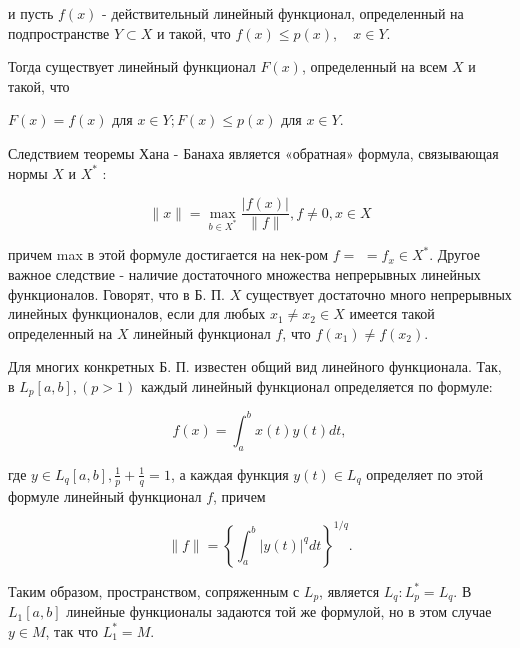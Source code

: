 \documentclass[10pt]{article}
\begin{document}
и пусть $f(x)$ - действительный линейный функционал, определенный на подпространстве $Y \subset X$ и такой, что $f(x) \leqslant p(x), \quad x \in Y$.



Тогда существует линейный функционал $F(x)$, определенный на всем $X$ и такой, что



$F(x)=f(x)$ для $x \in Y ; F(x) \leqslant p(x)$ для $x \in Y$.



Следствием теоремы Хана - Банаха является «обратная» формула, связывающая нормы $X$ и $X^{*}$ :



\[

\|x\|=\max _{b \in X^{*}} \frac{|f(x)|}{\|f\|}, f \neq 0, x \in X

\]



причем max в этой формуле достигается на нек-ром $f=$ $=f_{x} \in X^{*}$. Другое важное следствие - наличие достаточного множества непрерывных линейных функционалов. Говорят, что в Б. П. $X$ существует достаточно много непрерывных линейных функционалов, если для любых $x_{1} \neq x_{2} \in X$ имеется такой определенный на $X$ линейный функционал $f$, что $f\left(x_{1}\right) \neq f\left(x_{2}\right)$.



Для многих конкретных Б. П. известен общий вид линейного функционала. Так, в $L_{p}[a, b],(p>1)$ каждый линейный функционал определяется по формуле:



\[

f(x)=\int_{a}^{b} x(t) y(t) d t,

\]



где $y \in L_{q}[a, b], \frac{1}{p}+\frac{1}{q}=1$, а каждая функция $y(t) \in L_{q}$ определяет по этой формуле линейный функционал $f$, причем



\[

\|f\|=\left\{\int_{a}^{b}|y(t)|^{q} d t\right\}^{1 / q} .

\]



Таким образом, пространством, сопряженным с $L_{p}$, является $L_{q}: L_{p}^{*}=L_{q}$. В $L_{1}[a, b]$ линейные функционалы задаются той же формулой, но в этом случае $y \in M$, так что $L_{1}^{*}=M$.
\end{document}
